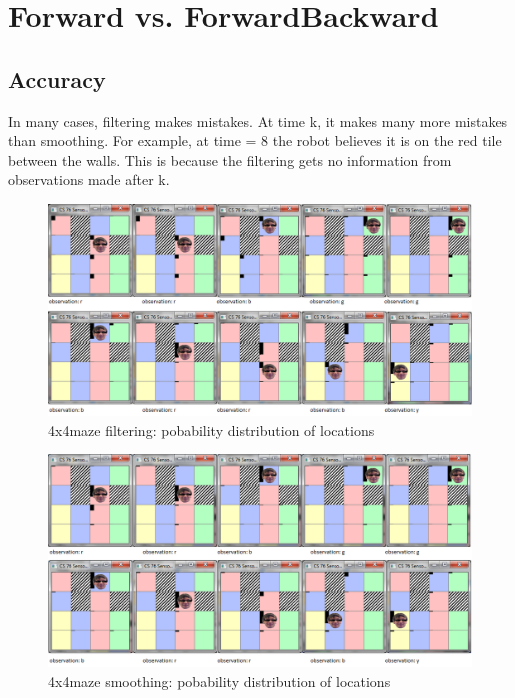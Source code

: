 \documentclass[a4paper]{article}
\begin{document}
\section{Forward vs. ForwardBackward}

\subsection{Accuracy}

In many cases, filtering makes mistakes. At time k, it makes many more mistakes than smoothing. For example, at time = 8 the robot believes it is on the red tile between the walls. This is because the filtering gets no information from observations made after k.

\begin{figure}[H]
\centering
\includegraphics[width=1\textwidth]{4x4WallMazeFilter.png}
\caption{\label{fig:2x2 maze}4x4maze filtering: pobability distribution of locations}
\end{figure}

\begin{figure}[H]
\centering
\includegraphics[width=1\textwidth]{4x4WallMazeSmoothing.png}
\caption{\label{fig:2x2 maze}4x4maze smoothing: pobability distribution of locations}
\end{figure}
\end{document}
